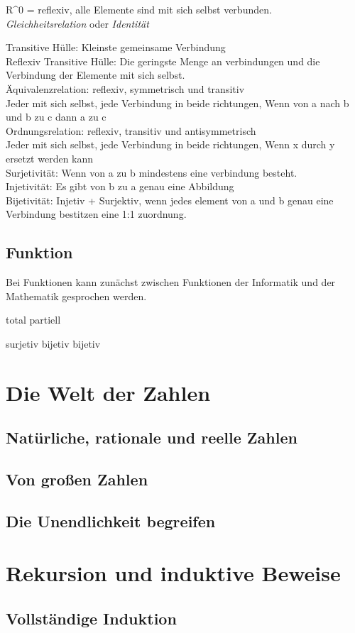 R^0 = reflexiv, alle Elemente sind mit sich selbst verbunden.\\

 \textit{Gleichheitsrelation} oder \textit{Identität}

Transitive Hülle: Kleinste gemeinsame Verbindung\\

Reflexiv Transitive Hülle: Die geringste Menge an verbindungen und die Verbindung der Elemente mit sich selbst.\\

Äquivalenzrelation: reflexiv, symmetrisch und transitiv\\
Jeder mit sich selbst, jede Verbindung in beide richtungen, Wenn von a nach b und b zu c dann a zu c\\

Ordnungsrelation: reflexiv, transitiv und antisymmetrisch \\
Jeder mit sich selbst, jede Verbindung in beide richtungen, Wenn x durch y ersetzt werden kann \\



Surjetivität: Wenn von a zu b mindestens eine verbindung besteht.\\

Injetivität: Es gibt von b zu a genau eine Abbildung\\


Bijetivität: Injetiv + Surjektiv, wenn jedes element von a und b genau eine Verbindung bestitzen eine 1:1 zuordnung.


\subsection{Funktion}

Bei Funktionen kann zunächst zwischen Funktionen der Informatik und der Mathematik gesprochen werden. 

total 
partiell

surjetiv
bijetiv
bijetiv


\section{Die Welt der Zahlen}
\subsection{Natürliche, rationale und reelle Zahlen}
\subsection{Von großen Zahlen}
\subsection{Die Unendlichkeit begreifen}

\section{Rekursion und induktive Beweise}
\subsection{Vollständige Induktion}






